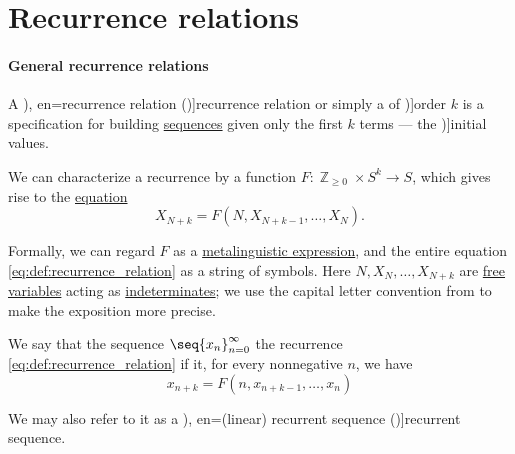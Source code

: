 \section{Recurrence relations}\label{sec:recurrence_relations}

\paragraph{General recurrence relations}

\begin{definition}\label{def:recurrence_relation}\mimprovised
  A \term[ru=рекуррентное уравнение (\cite[21]{Юмагулов2015ДинамическиеСистемы}), en=recurrence relation (\cite[def. 2.4.4]{Rosen2019DiscreteMathematics})]{recurrence relation} or simply a  of \term[en=order (of linear recurring sequence) (\cite[395]{LidlNiederreiter1997FiniteFields})]{order} \( k \) is a specification for building \hyperref[def:sequence]{sequences} given only the first \( k \) terms --- the \term[en=initial values (\cite[396]{LidlNiederreiter1997FiniteFields})]{initial values}.

  We can characterize a recurrence by a function \( F: \BbbZ_{\geq 0} \times S^k \to S \), which gives rise to the \hyperref[def:equation]{equation}
  \begin{equation}\label{eq:def:recurrence_relation}
    X_{N+k} = F(N, X_{N+k-1}, \ldots, X_N).
  \end{equation}

  Formally, we can regard \( F \) as a \hyperref[con:expression]{metalinguistic expression}, and the entire equation \eqref{eq:def:recurrence_relation} as a string of symbols. Here \( N, X_N, \ldots, X_{N+k} \) are \hyperref[con:variable_binding]{free variables} acting as \hyperref[con:indeterminate]{indeterminates}; we use the capital letter convention from  to make the exposition more precise.

  \begin{thmenum}
     We say that the sequence \( \seq{ x_n }_{n=0}^\infty \)  the recurrence \eqref{eq:def:recurrence_relation} if it, for every nonnegative \( n \), we have
    \begin{equation}\label{eq:def:recurrence_relation/sequence}
      x_{n+k} = F(n, x_{n+k-1}, \ldots, x_n)
    \end{equation}

    We may also refer to it as a \term[ru=рекуррентная последовательность (\cite[21]{Юмагулов2015ДинамическиеСистемы}), en=(linear) recurrent sequence (\cite[395]{LidlNiederreiter1997FiniteFields})]{recurrent sequence}.


\end{thmenum}
\end{definition}
